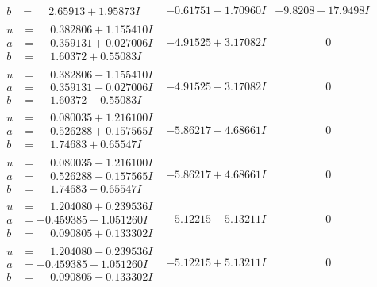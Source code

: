 \documentclass[1p]{elsarticle_modified}
\theoremstyle{definition}
\begin{document}
$$\begin{array}{c|c|c}
\begin{aligned}
b &= \phantom{-}2.65913 + 1.95873 I\end{aligned}
 & -0.61751 - 1.70960 I & -9.8208 - 17.9498 I \\ \hline\begin{aligned}
u &= \phantom{-}0.382806 + 1.155410 I \\
a &= \phantom{-}0.359131 + 0.027006 I \\
b &= \phantom{-}1.60372 + 0.55083 I\end{aligned}
 & -4.91525 + 3.17082 I & \phantom{-0.000000 } 0 \\ \hline\begin{aligned}
u &= \phantom{-}0.382806 - 1.155410 I \\
a &= \phantom{-}0.359131 - 0.027006 I \\
b &= \phantom{-}1.60372 - 0.55083 I\end{aligned}
 & -4.91525 - 3.17082 I & \phantom{-0.000000 } 0 \\ \hline\begin{aligned}
u &= \phantom{-}0.080035 + 1.216100 I \\
a &= \phantom{-}0.526288 + 0.157565 I \\
b &= \phantom{-}1.74683 + 0.65547 I\end{aligned}
 & -5.86217 - 4.68661 I & \phantom{-0.000000 } 0 \\ \hline\begin{aligned}
u &= \phantom{-}0.080035 - 1.216100 I \\
a &= \phantom{-}0.526288 - 0.157565 I \\
b &= \phantom{-}1.74683 - 0.65547 I\end{aligned}
 & -5.86217 + 4.68661 I & \phantom{-0.000000 } 0 \\ \hline\begin{aligned}
u &= \phantom{-}1.204080 + 0.239536 I \\
a &= -0.459385 + 1.051260 I \\
b &= \phantom{-}0.090805 + 0.133302 I\end{aligned}
 & -5.12215 - 5.13211 I & \phantom{-0.000000 } 0 \\ \hline\begin{aligned}
u &= \phantom{-}1.204080 - 0.239536 I \\
a &= -0.459385 - 1.051260 I \\
b &= \phantom{-}0.090805 - 0.133302 I\end{aligned}
 & -5.12215 + 5.13211 I & \phantom{-0.000000 } 0 \\ \hline\begin{aligned}

\end{aligned}
\end{array}$$
\end{document}
